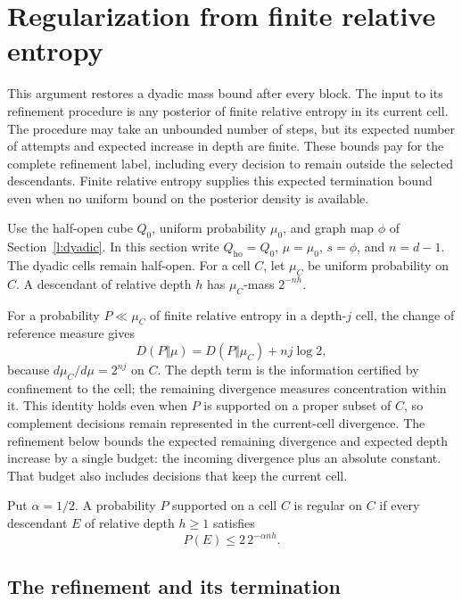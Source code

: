 \section{Regularization from finite relative entropy}
\label{l:finite-entropy:section}

This argument restores a dyadic mass bound after every block.  The
input to its refinement procedure is any posterior of finite relative
entropy in its current cell.  The procedure may take an unbounded
number of steps, but its expected number of attempts and expected
increase in depth are finite.  These bounds pay for the complete
refinement label, including every decision to remain outside the
selected descendants.  Finite relative entropy supplies this expected
termination bound even when no uniform bound on the posterior density
is available.

Use the half-open cube \(Q_0\), uniform probability \(\mu_0\), and
graph map \(\phi\) of Section~\ref{l:dyadic}.  In this section write
\(Q_{\mathrm{ho}}=Q_0\), \(\mu=\mu_0\), \(s=\phi\), and
\(n=d-1\).  The dyadic cells remain half-open.
For a cell \(C\), let \(\mu_C\) be uniform probability on \(C\).
A descendant of relative depth \(h\) has \(\mu_C\)-mass \(2^{-nh}\).

For a probability \(P\ll\mu_C\) of finite relative entropy in a
depth-\(j\) cell, the change of reference measure gives
\begin{equation}\label{l:finite-entropy:cell-divergence}
 D(P\Vert\mu)=D(P\Vert\mu_C)+nj\log2,
\end{equation}
because \(d\mu_C/d\mu=2^{nj}\) on \(C\). The depth term is
the information certified by confinement to the cell; the remaining
divergence measures concentration within it. This identity holds even
when \(P\) is supported on a proper subset of \(C\), so complement
decisions remain represented in the current-cell divergence. The
refinement below bounds the expected remaining divergence and expected
depth increase by a single budget: the incoming divergence plus an
absolute constant. That budget also includes decisions that keep the
current cell.

\begin{definition}\label{l:finite-entropy:regular}
Put \(\alpha=1/2\).  A probability \(P\) supported on a cell \(C\)
is regular on \(C\) if every descendant \(E\) of relative depth
\(h\ge1\) satisfies
\[
 P(E)\le2\,2^{-\alpha nh}.
\]
\end{definition}

\subsection{The refinement and its termination}

